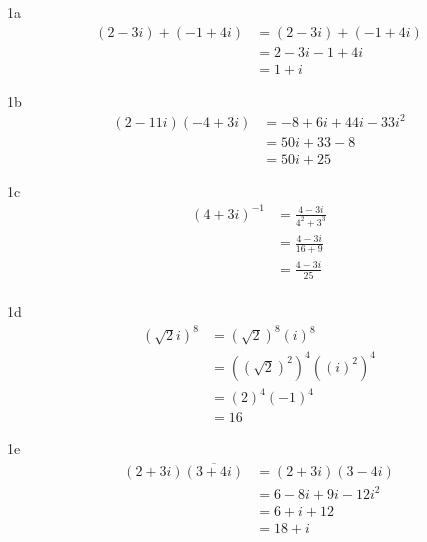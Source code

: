 \begin{question}{1a}
\begin{align*}
(2-3i)+(-1 +4i) &= (2-3i)+(-1 +4i)\\
&= 2 -3i -1 + 4i\\
&= 1 + i
\end{align*}
\end{question}

\begin{question}{1b}
\begin{align*}
(2-11i)(-4+3i) 
&= -8 + 6i + 44i - 33i^2\\ 
&= 50i + 33 -8 \\
&= 50i +25 
\end{align*}
\end{question}
\begin{question}{1c}
\begin{align*}
(4+3i)^{-1}
	&= \frac{4-3i}{4^2+3^3} \\
	&= \frac{4-3i}{16+9} \\
	&= \frac{4-3i}{25} \\
\end{align*}
\end{question}
\begin{question}{1d}
\begin{align*}
(\sqrt{2}i)^{8}
 &= (\sqrt{2})^8(i)^8\\ 
 &= ((\sqrt{2})^2)^4((i)^2)^4\\ 
 &= (2)^4(-1)^4\\ 
 &= 16
\end{align*}
\end{question}
\begin{question}{1e}
\begin{align*}
(2+3i)\overline{(3+4i)}
 &= (2+3i)(3-4i)\\ 
 &= 6-8i+9i-12i^2\\ 
 &= 6+i+12\\ 
 &= 18+i\\ 
\end{align*}
\end{question}
